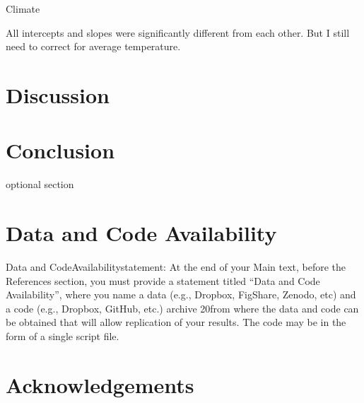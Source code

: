 \documentclass[11pt, a4paper, titlepage]{article}
\begin{document}
Climate \newline

All intercepts and slopes were significantly different from each other. But I still need to correct for average temperature.
 
	 
	 
	 

    \clearpage
    
     \section*{Discussion}
     
     \clearpage
     
     \section*{Conclusion }
     optional section
     \clearpage
    
    \section*{Data and Code Availability}
    Data  and  CodeAvailabilitystatement:  At  the  end  of  your  Main  text,  before  the  References section, you must provide a statement titled “Data and Code Availability”, where you name a data (e.g., Dropbox, FigShare, Zenodo, etc) and a code (e.g., Dropbox, GitHub, etc.) archive 
    20from where the data and code can be obtained that will allow replication of your results. The code may be in the form of a single script file.
    
    \clearpage
    \section*{Acknowledgements}
    

    
\end{document}
